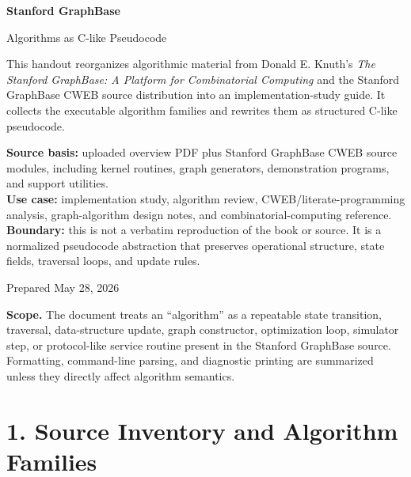 \documentclass[11pt]{article}
\begin{document}
\hypersetup{pageanchor=false}

\begin{titlepage}
  \centering
  \vspace*{2.0cm}
  {\Huge\bfseries\color{SGBBlue}Stanford GraphBase\par}
  \vspace{0.45cm}
  {\LARGE Algorithms as C-like Pseudocode\par}
  \vspace{1.2cm}
  \begin{scopebox}
  This handout reorganizes algorithmic material from Donald E. Knuth's \textit{The Stanford GraphBase: A Platform for Combinatorial Computing} and the Stanford GraphBase CWEB source distribution into an implementation-study guide. It collects the executable algorithm families and rewrites them as structured C-like pseudocode.
  \end{scopebox}
  \vspace{0.85cm}
  \begin{methodbox}
  \textbf{Source basis:} uploaded overview PDF plus Stanford GraphBase CWEB source modules, including kernel routines, graph generators, demonstration programs, and support utilities.\\
  \textbf{Use case:} implementation study, algorithm review, CWEB/literate-programming analysis, graph-algorithm design notes, and combinatorial-computing reference.\\
  \textbf{Boundary:} this is not a verbatim reproduction of the book or source. It is a normalized pseudocode abstraction that preserves operational structure, state fields, traversal loops, and update rules.
  \end{methodbox}
  \vfill
  {\large Prepared May 28, 2026\par}
\end{titlepage}

\hypersetup{pageanchor=true}
\tableofcontents
\clearpage
{}

\begin{scopebox}
\textbf{Scope.} The document treats an ``algorithm'' as a repeatable state transition, traversal, data-structure update, graph constructor, optimization loop, simulator step, or protocol-like service routine present in the Stanford GraphBase source. Formatting, command-line parsing, and diagnostic printing are summarized unless they directly affect algorithm semantics.
\end{scopebox}
\section{1. Source Inventory and Algorithm Families}\label{source-inventory-and-algorithm-families}
\end{document}

